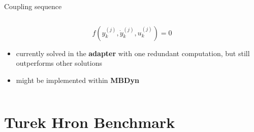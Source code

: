 \documentclass[10pt,t]{beamer}
\begin{document}
\begin{frame}{Coupling sequence}
\begin{columns}
\begin{column}{0.5\textwidth}
\vspace{0.4cm}
$$f\left(y_k^{(j)},\dot{y}_k^{(j)},u_k^{(j)}\right)=0$$

\pause

\begin{itemize}
    \item currently solved in the \textbf{adapter} with one redundant computation, but still outperforms other solutions
    \item might be implemented within \textcolor{dorange}{\textbf{MBDyn}}
\end{itemize}


\end{column}


\end{columns}

    
\end{frame}





\section{Turek Hron Benchmark}
\end{document}
